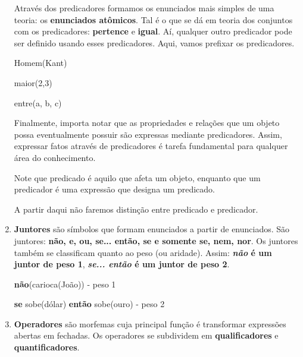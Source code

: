 \begin{enumerate}[label=\arabic*)]
    Através dos predicadores formamos os enunciados mais simples de uma teoria: os \textbf{enunciados atômicos}.
    Tal é o que se dá em teoria dos conjuntos com os predicadores: \textbf{pertence} e \textbf{igual}.
    Aí, qualquer outro predicador pode ser definido usando esses predicadores.
    Aqui, vamos prefixar os predicadores.

    \setcounter{exemplo}{0}
    \begin{exemplo}
        Homem(Kant)
    \end{exemplo}
    \begin{exemplo}
        maior(2,3)
    \end{exemplo}
    \begin{exemplo}
        entre(a, b, c)
    \end{exemplo}

    Finalmente, importa notar que as propriedades e relações que um objeto possa eventualmente possuir são expressas mediante predicadores.
    Assim, expressar fatos através de predicadores é tarefa fundamental para qualquer área do conhecimento.

    Note que predicado é aquilo que afeta um objeto, enquanto que um predicador é uma expressão que designa um predicado.

    A partir daqui não faremos distinção entre predicado e predicador.

    \item \textbf{Juntores} são símbolos que formam enunciados a partir de enunciados.
    São juntores: \textbf{não, e, ou, se... então, se e somente se, nem, nor}.
    Os juntores também se classificam quanto ao peso (ou aridade).
    Assim: \textbf{\textit{não} é um juntor de peso 1}, \textbf{\textit{se... então} é um juntor de peso 2}.

    \setcounter{exemplo}{0}
        \begin{exemplo}
            \textbf{não}(carioca(João)) - peso 1 %
        \end{exemplo}

        \begin{exemplo}
            \textbf{se} sobe(dólar) \textbf{então} sobe(ouro) - peso 2 %
        \end{exemplo}
    \item \textbf{Operadores} são morfemas cuja principal função é transformar expressões abertas em fechadas.
    Os operadores se subdividem em \textbf{qualificadores} e \textbf{quantificadores}.


\end{enumerate}
